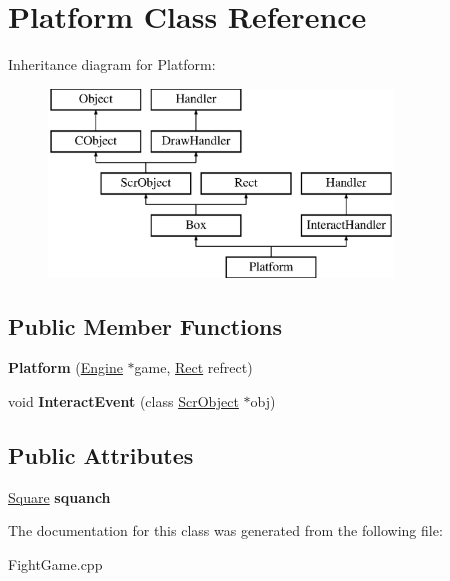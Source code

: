 \hypertarget{class_platform}{}\section{Platform Class Reference}
\label{class_platform}
Inheritance diagram for Platform\+:\begin{figure}[H]
\begin{center}
\leavevmode
\includegraphics[height=5.000000cm]{class_platform}
\end{center}
\end{figure}
\subsection*{Public Member Functions}
\begin{DoxyCompactItemize}
\item 
\hypertarget{class_platform_aed64a657550c688d2b8a3087cf85d345}{}\label{class_platform_aed64a657550c688d2b8a3087cf85d345} 
{\bfseries Platform} (\hyperlink{class_engine}{Engine} $\ast$game, \hyperlink{class_rect}{Rect} refrect)
\item 
\hypertarget{class_platform_a18a98565e486b1113f729cf737178069}{}\label{class_platform_a18a98565e486b1113f729cf737178069} 
void {\bfseries Interact\+Event} (class \hyperlink{class_scr_object}{Scr\+Object} $\ast$obj)
\end{DoxyCompactItemize}
\subsection*{Public Attributes}
\begin{DoxyCompactItemize}
\item 
\hypertarget{class_platform_ae0c7c9a6a9a6eaa040d35eb245d7bd37}{}\label{class_platform_ae0c7c9a6a9a6eaa040d35eb245d7bd37} 
\hyperlink{class_square}{Square} {\bfseries squanch}
\end{DoxyCompactItemize}


The documentation for this class was generated from the following file\+:\begin{DoxyCompactItemize}
\item 
Fight\+Game.\+cpp\end{DoxyCompactItemize}
